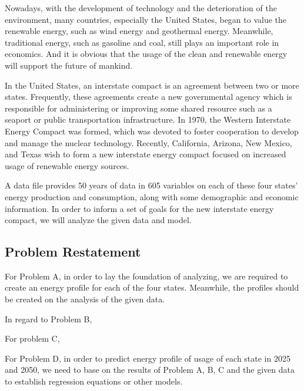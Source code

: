 \documentclass[a4paper,11pt]{article}
\begin{document}
\par Nowadays, with the development of technology and the deterioration of the environment, many countries, especially the United States, began to value the renewable energy, such as wind energy and geothermal energy. Meanwhile, traditional energy, such as gasoline and coal, still plays an important role in economics. And it is obvious that the usage of the clean and renewable energy will support the future of mankind.
\par In the United States, an interstate compact is an agreement between two or more states. Frequently, these agreements create a new governmental agency which is responsible for administering or improving some shared resource such as a seaport or public transportation infrastructure.\cite{1} In 1970, the Western Interstate Energy Compact was formed, which was devoted to foster cooperation to develop and manage the nuclear technology. Recently, California, Arizona, New Mexico, and Texas wish to form a new interstate energy compact focused on increased usage of renewable energy sources. 
\par A data file provides 50 years of data in 605 variables on each of these four states' energy production and consumption, along with some demographic and economic information. In order to inform a set of goals for the new interstate energy compact, we will analyze the given data and model.


\subsection{Problem Restatement}
\par For Problem A, in order to lay the foundation of analyzing, we are required to create an energy profile for each of the four states. Meanwhile, the profiles should be created on the analysis of the given data.

\par In regard to Problem B, 

\par For problem C, 

\par For Problem D, in order to predict energy profile of usage of each state in 2025 and 2050, we need to base on the results of Problem A, B, C and the given data to establish regression equations or other models.
\end{document}
